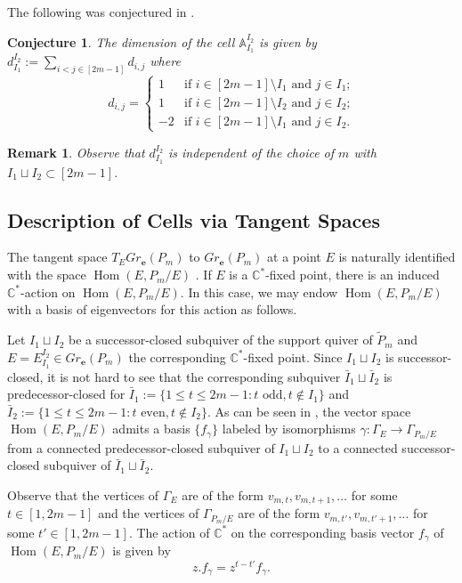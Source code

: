 \documentclass{amsart}
\newtheorem{conjecture}[theorem]{Conjecture}
\newtheorem{remark}[theorem]{Remark}
\numberwithin{equation}{section}
\renewcommand{\AA}{\mathbb{A}}
\newcommand{\CC}{\mathbb{C}}
\newcommand{\bfe}{\mathbf{e}}
\newcommand{\Hom}{\operatorname{Hom}}
\begin{document}
    The following was conjectured in \cite[Conj. 5.21]{rupel-weist}.
    \begin{conjecture}
      \label{conj:cell dimension}
      The dimension of the cell $\AA_{I_1}^{I_2}$ is given by $d_{I_1}^{I_2}:=\sum_{i<j\in[2m-1]} d_{i,j}$ where 
      \[
        d_{i,j}=\begin{cases} 1 & \text{if $i\in[2m-1]\setminus I_1$ and $j\in I_1$;}\\  1 & \text{if $i\in[2m-1]\setminus I_2$ and $j\in I_2$;}\\ -2 & \text{if $i\in[2m-1]\setminus I_1$ and $j\in I_2$.} \end{cases}
      \]
    \end{conjecture}
    \begin{remark}
      Observe that $d_{I_1}^{I_2}$ is independent of the choice of $m$ with $I_1\sqcup I_2\subset[2m-1]$.
    \end{remark}

  \subsection{Description of Cells via Tangent Spaces}
    \label{sec:tangent parametrization}
    The tangent space $T_E Gr_\bfe(P_m)$ to $Gr_\bfe(P_m)$ at a point $E$ is naturally identified with the space $\Hom(E,P_m/E)$ \cite{cr}.
    If $E$ is a $\CC^*$-fixed point, there is an induced $\CC^*$-action on $\Hom(E,P_m/E)$.
    In this case, we may endow $\Hom(E,P_m/E)$ with a basis of eigenvectors for this action as follows.

    Let $I_1\sqcup I_2$ be a successor-closed subquiver of the support quiver of $\tilde P_m$ and $E=E_{I_1}^{I_2}\in Gr_\bfe(P_m)$ the corresponding $\CC^*$-fixed point.
    Since $I_1\sqcup I_2$ is successor-closed, it is not hard to see that the corresponding subquiver $\bar{I}_1\sqcup\bar{I}_2$ is predecessor-closed for $\bar{I}_1:=\{1\le t\le 2m-1:\text{$t$ odd},t\notin I_1\}$ and $\bar{I}_2:=\{1\le t\le 2m-1:\text{$t$ even},t\notin I_2\}$.
    As can be seen in \cite[Prop. 2.0.2]{cerulli irelli-esposito}, the vector space $\Hom(E,P_m/E)$ admits a basis $\{f_\gamma\}$ labeled by isomorphisms $\gamma:\Gamma_E\to\Gamma_{P_m/E}$ from a connected predecessor-closed subquiver of $I_1\sqcup I_2$ to a connected successor-closed subquiver of $\bar{I}_1\sqcup\bar{I}_2$.

    Observe that the vertices of $\Gamma_E$ are of the form $v_{m,t},v_{m,t+1},\ldots$ for some $t\in[1,2m-1]$ and the vertices of $\Gamma_{P_m/E}$ are of the form $v_{m,t'},v_{m,t'+1},\ldots$ for some $t'\in[1,2m-1]$.
    The action of $\CC^*$ on the corresponding basis vector $f_\gamma$ of $\Hom(E,P_m/E)$ is given by
    \[z.f_\gamma=z^{t-t'}f_\gamma.\]
\end{document}
